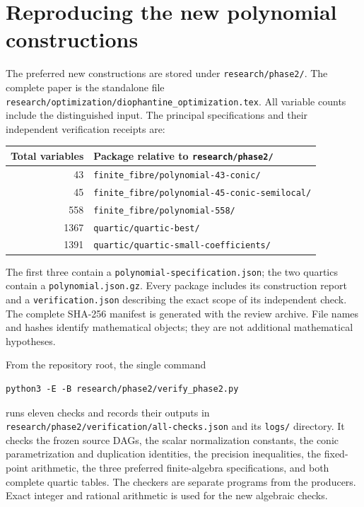 \section{Reproducing the new polynomial constructions}
\label{sec:phase2-reproducibility}

The preferred new constructions are stored under
\nolinkurl{research/phase2/}. The complete paper is the standalone file
\nolinkurl{research/optimization/diophantine_optimization.tex}.
All variable counts include the distinguished input. The principal
specifications and their independent verification receipts are:
\begin{center}
\small
\begin{tabular}{r p{82mm}}
\toprule
Total variables & Package relative to \texttt{research/phase2/}\\
\midrule
43 & \nolinkurl{finite_fibre/polynomial-43-conic/}\\
45 & \nolinkurl{finite_fibre/polynomial-45-conic-semilocal/}\\
558 & \nolinkurl{finite_fibre/polynomial-558/}\\
1367 & \nolinkurl{quartic/quartic-best/}\\
1391 & \nolinkurl{quartic/quartic-small-coefficients/}\\
\bottomrule
\end{tabular}
\end{center}
The first three contain a
\nolinkurl{polynomial-specification.json}; the two quartics contain a
\nolinkurl{polynomial.json.gz}. Every package includes its construction
report and a \nolinkurl{verification.json} describing the exact scope
of its independent check. The complete SHA-256 manifest is generated
with the review archive. File names and hashes identify mathematical
objects; they are not additional mathematical hypotheses.

From the repository root, the single command
\begin{verbatim}
python3 -E -B research/phase2/verify_phase2.py
\end{verbatim}
runs eleven checks and records their outputs in
\nolinkurl{research/phase2/verification/all-checks.json} and its
\nolinkurl{logs/} directory. It checks the frozen source DAGs,
the scalar normalization constants, the conic parametrization and
duplication identities, the precision inequalities, the fixed-point
arithmetic, the three preferred finite-algebra specifications, and
both complete quartic tables. The checkers are separate programs from
the producers. Exact integer and rational arithmetic is used for the
new algebraic checks.

